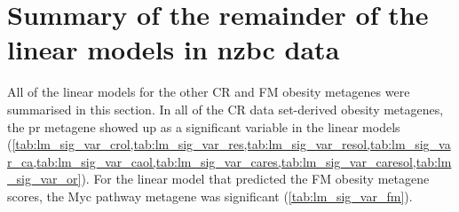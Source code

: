	\newpage

	\section{Summary of the remainder of the linear models in \gls{nzbc} data}
	\label{sec:summary_of_the_linear_models_in_nzbc_data}

	All of the linear models for the other CR and FM obesity metagenes were summarised in this section.
	In all of the CR data set-derived obesity metagenes, the \gls{pr} metagene showed up as a significant variable in the linear models (\cref{tab:lm_sig_var_crol,tab:lm_sig_var_res,tab:lm_sig_var_resol,tab:lm_sig_var_ca,tab:lm_sig_var_caol,tab:lm_sig_var_cares,tab:lm_sig_var_caresol,tab:lm_sig_var_or}).
	For the linear model that predicted the FM obesity metagene scores, the Myc pathway metagene was significant (\cref{tab:lm_sig_var_fm}).

